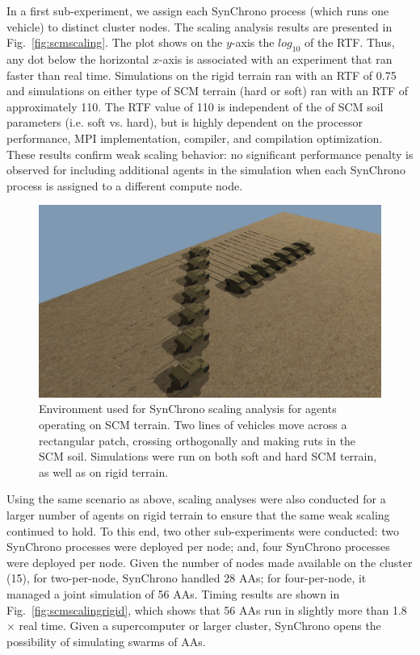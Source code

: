 \documentclass[12pt,twocolumn]{article}
\begin{document}
In a first sub-experiment, we assign each SynChrono process (which runs one vehicle) to distinct cluster nodes. The scaling analysis results are presented in Fig.~\ref{fig:scmscaling}. The plot shows on the $y$-axis the $ log_{10} $ of the RTF. Thus, any dot below the horizontal $x$-axis is associated with an experiment that ran faster than real time. Simulations on the rigid terrain ran with an RTF of 0.75 and simulations on either type of SCM terrain (hard or soft) ran with an RTF of approximately 110. The RTF value of 110 is independent of the of SCM soil parameters (i.e. soft vs. hard), but is highly dependent on the processor performance, MPI implementation, compiler, and compilation optimization. These results confirm weak scaling behavior: no significant performance penalty is observed for including additional agents in the simulation when each SynChrono process is assigned to a different compute node. 

\begin{figure}
    \centering
    \includegraphics[width=\columnwidth]{Figs/Syn-SCM-setup.png}
    \caption{Environment used for SynChrono scaling analysis for agents operating on SCM terrain. Two lines of vehicles move across a rectangular patch, crossing orthogonally and making ruts in the SCM soil. Simulations were run on both soft and hard SCM terrain, as well as on rigid terrain.}
    \label{fig:scalingenv}
\end{figure}

Using the same scenario as above, scaling analyses were also conducted for a larger number of agents on rigid terrain to ensure that the same weak scaling continued to hold. To this end, two other sub-experiments were conducted: two SynChrono processes were deployed per node; and, four SynChrono processes were deployed per node. Given the number of nodes made available on the cluster (15), for two-per-node, SynChrono handled 28 AAs; for four-per-node, it managed a joint simulation of 56 AAs. Timing results are shown in Fig.~\ref{fig:scmscalingrigid}, which shows that 56 AAs run in slightly more than 1.8$ \times $ real time. Given a supercomputer or larger cluster, SynChrono opens the possibility of simulating swarms of AAs.
\end{document}
